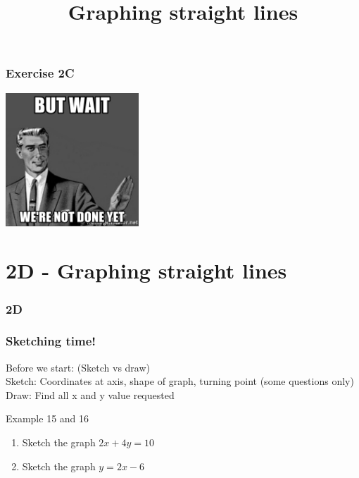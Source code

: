 \documentclass{beamer}
\begin{document}
\begin{frame}
    \frametitle{Exercise 2C}
    \begin{center}
        \includegraphics[width = 5cm]{Wait.jpg}
    \end{center}
\end{frame}

\section{2D - Graphing straight lines}
\begin{frame}
    \frametitle{2D}
    \begin{center}
        \title{Graphing straight lines}
        \maketitle
    \end{center}
\end{frame}

\begin{frame}[t]
    \frametitle{Sketching time!}
    Before we start: (Sketch vs draw)\\
    Sketch: Coordinates at axis, shape of graph, turning point (some questions only)\\
    Draw: Find all x and y value requested\\
    \begin{block}{Example 15 and 16}
        \begin{enumerate}
            \item Sketch the graph $2x + 4y = 10$
            \item Sketch the graph $y = 2x-6$
        \end{enumerate}
    \end{block}
\end{frame}

\begin{frame}
\end{frame}
\end{document}
